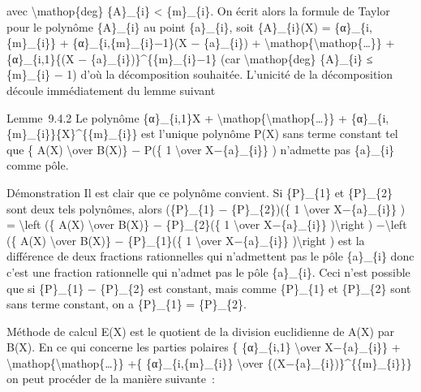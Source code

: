 \documentclass[]{article}
\begin{document}
avec \textbackslash{}mathop\{deg\} \{A\}\_\{i\} \textless{}
\{m\}\_\{i\}. On écrit alors la formule de Taylor pour le polynôme
\{A\}\_\{i\} au point \{a\}\_\{i\}, soit \{A\}\_\{i\}(X) =
\{α\}\_\{i,\{m\}\_\{i\}\} + \{α\}\_\{i,\{m\}\_\{i\}−1\}(X −
\{a\}\_\{i\}) +
\textbackslash{}mathop\{\textbackslash{}mathop\{\ldots{}\}\} +
\{α\}\_\{i,1\}\{(X − \{a\}\_\{i\})\}\^{}\{\{m\}\_\{i\}−1\} (car
\textbackslash{}mathop\{deg\} \{A\}\_\{i\} ≤ \{m\}\_\{i\} − 1) d'où la
décomposition souhaitée. L'unicité de la décomposition découle
immédiatement du lemme suivant

Lemme~9.4.2 Le polynôme \{α\}\_\{i,1\}X +
\textbackslash{}mathop\{\textbackslash{}mathop\{\ldots{}\}\} +
\{α\}\_\{i,\{m\}\_\{i\}\}\{X\}\^{}\{\{m\}\_\{i\}\} est l'unique polynôme
P(X) sans terme constant tel que \{ A(X) \textbackslash{}over B(X)\} −
P(\{ 1 \textbackslash{}over X−\{a\}\_\{i\}\} ) n'admette pas
\{a\}\_\{i\} comme pôle.

Démonstration Il est clair que ce polynôme convient. Si \{P\}\_\{1\} et
\{P\}\_\{2\} sont deux tels polynômes, alors (\{P\}\_\{1\} −
\{P\}\_\{2\})(\{ 1 \textbackslash{}over X−\{a\}\_\{i\}\} ) =
\textbackslash{}left (\{ A(X) \textbackslash{}over B(X)\} −
\{P\}\_\{2\}(\{ 1 \textbackslash{}over X−\{a\}\_\{i\}\}
)\textbackslash{}right ) −\textbackslash{}left (\{ A(X)
\textbackslash{}over B(X)\} − \{P\}\_\{1\}(\{ 1 \textbackslash{}over
X−\{a\}\_\{i\}\} )\textbackslash{}right ) est la différence de deux
fractions rationnelles qui n'admettent pas le pôle \{a\}\_\{i\} donc
c'est une fraction rationnelle qui n'admet pas le pôle \{a\}\_\{i\}.
Ceci n'est possible que si \{P\}\_\{1\} − \{P\}\_\{2\} est constant,
mais comme \{P\}\_\{1\} et \{P\}\_\{2\} sont sans terme constant, on a
\{P\}\_\{1\} = \{P\}\_\{2\}.

Méthode de calcul E(X) est le quotient de la division euclidienne de
A(X) par B(X). En ce qui concerne les parties polaires \{ \{α\}\_\{i,1\}
\textbackslash{}over X−\{a\}\_\{i\}\} +
\textbackslash{}mathop\{\textbackslash{}mathop\{\ldots{}\}\} +\{
\{α\}\_\{i,\{m\}\_\{i\}\} \textbackslash{}over
\{(X−\{a\}\_\{i\})\}\^{}\{\{m\}\_\{i\}\}\} on peut procéder de la
manière suivante~:
\end{document}
